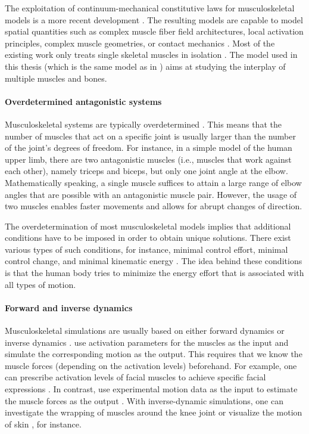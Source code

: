 The exploitation of continuum-mechani\-cal constitutive laws
for musculoskeletal models is a more recent development \cite{Roehrle16Two}.
The resulting models are capable to model spatial quantities
such as complex muscle fiber field architectures,
local activation principles, complex muscle geometries, or contact mechanics
.
Most of the existing work only treats single skeletal muscles in isolation
.
The model used in this thesis
(which is the same model as in
)
aims at studying the interplay of multiple muscles and bones.

\paragraph{Overdetermined antagonistic systems}

Musculoskeletal systems are typically overdetermined \cite{Roehrle16Two}.
This means that the number of muscles that act on a specific joint
is usually larger than the number of the joint's degrees of freedom.
For instance, in a simple model of the human upper limb,
there are two antagonistic muscles
(i.e., muscles that work against each other), namely triceps and biceps,
but only one joint angle at the elbow.
Mathematically speaking, a single muscle suffices to attain
a large range of elbow angles
that are possible with an antagonistic muscle pair.
However, the usage of two muscles enables faster movements and
allows for abrupt changes of direction.

The overdetermination of most musculoskeletal models
implies that additional conditions have to be imposed in order
to obtain unique solutions.
There exist various types of such conditions,
for instance, minimal control effort, minimal control change, and
minimal kinematic energy \cite{Valentin18Gradient}.
The idea behind these conditions is that the human body
tries to minimize the energy effort that is associated with
all types of motion.

\paragraph{Forward and inverse dynamics}

Musculoskeletal simulations are usually based on
either forward dynamics or inverse dynamics \cite{Valentin18Gradient}.
 use activation parameters
for the muscles as the input and simulate the corresponding motion
as the output.
This requires that we know the muscle forces
(depending on the activation levels) beforehand.
For example, one can prescribe activation levels of facial muscles
to achieve specific facial expressions \cite{Wu13Modelling}.
In contrast, 
use experimental motion data as the input
to estimate the muscle forces as the output \cite{Roehrle16Two}.
With inverse-dynamic simulations,
one can investigate the wrapping of muscles
around the knee joint \cite{Fernandez05Anatomically} or
visualize the motion of skin \cite{Lee09Comprehensive}, for instance.



